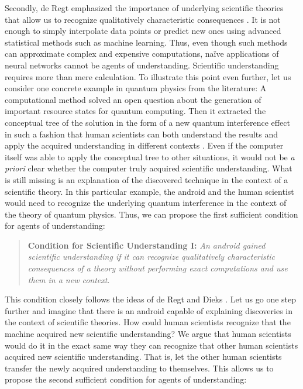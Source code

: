 Secondly, de Regt emphasized the importance of underlying scientific theories that allow us to recognize qualitatively characteristic consequences \cite{de2017understanding}. It is not enough to simply interpolate data points or predict new ones using advanced statistical methods such as machine learning. Thus, even though such methods can approximate complex and expensive computations, na\"ive applications of neural networks cannot be agents of understanding. Scientific understanding requires more than mere calculation. To illustrate this point even further, let us consider one concrete example in quantum physics from the literature: A computational method solved an open question about the generation of important resource states for quantum computing. Then it extracted the conceptual tree of the solution in the form of a new quantum interference effect in such a fashion that human scientists can both understand the results and apply the acquired understanding in different contexts \cite{krenn2020conceptual}. Even if the computer itself was able to apply the conceptual tree to other situations, it would not be \textit{a priori} clear whether the computer truly acquired scientific understanding. What is still missing is an explanation of the discovered technique in the context of a scientific theory. In this particular example, the android and the human scientist would need to recognize the underlying quantum interference in the context of the theory of quantum physics. Thus, we can propose the first sufficient condition for agents of understanding:


\begin{quote}
\textbf{Condition for Scientific Understanding I:}
\textit{An android gained scientific understanding if it can recognize qualitatively characteristic consequences of a theory without performing exact computations and use them in a new context}.
\end{quote}



This condition closely follows the ideas of de Regt and Dieks \cite{de2005contextual}. Let us go one step further and imagine that there is an android capable of explaining discoveries in the context of scientific theories. How could human scientists recognize that the machine acquired new scientific understanding? We argue that human scientists would do it in the exact same way they can recognize that other human scientists acquired new scientific understanding. That is, let the other human scientists transfer the newly acquired understanding to themselves. This allows us to propose the second sufficient condition for agents of understanding:


